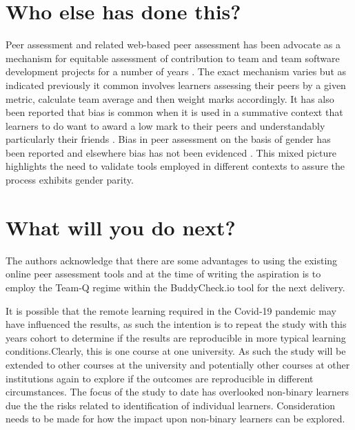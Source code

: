 \documentclass[sigconf, anonymous=true]{acmart}
\begin{document}
\section{Who else has done this?}
Peer assessment and related web-based peer assessment has been advocate as a mechanism for equitable assessment of contribution to team and team software development projects for a number of years \cite{Clark2005,Raban_Litchfield_2007, Gordon2010,Fagerholm, Britton2017,Philips21}. The exact mechanism varies but as indicated previously it common involves learners assessing their peers by a given metric, calculate team average and then weight marks accordingly. It has also been reported that bias is common when it is used in a summative context that learners to do want to award a low mark to their peers and understandably particularly their friends \cite{Sridharam2003}.  Bias in peer assessment on the basis of gender has been reported \cite{Heels2019,Stonewall2018} and elsewhere bias has not been evidenced \cite{Tucker2014,Falchikov1997}. This mixed picture highlights the need to validate tools employed in different contexts to assure the process exhibits gender parity.

\section{What will you do next?}
The authors acknowledge that there are some advantages to using the existing online peer assessment tools and at the time of writing the aspiration is to employ the Team-Q regime within the BuddyCheck.io tool for the next delivery.

It is possible that the remote learning required in the Covid-19 pandemic may have influenced the results, as such the intention is to repeat the study with this years cohort to determine if the results are reproducible in more typical learning conditions.Clearly, this is one course at one university. As such the study will be extended to other courses at the university and potentially other courses at other institutions again to explore if the outcomes are reproducible in different circumstances. The focus of the study to date has overlooked non-binary learners due the the risks related to identification of individual learners. Consideration needs to be made for how the impact upon non-binary learners can be explored.
\end{document}
